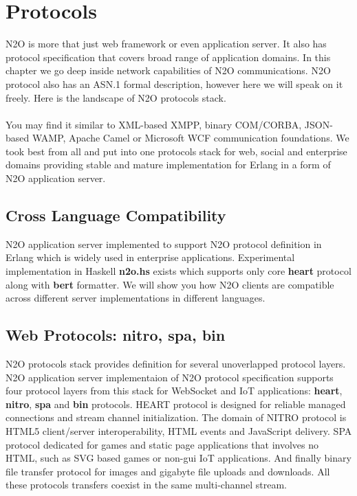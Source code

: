 \section{Protocols}
N2O is more that just web framework or even application server.
It also has protocol specification that covers broad range of application domains.
In this chapter we go deep inside network capabilities of N2O communications.
N2O protocol also has an ASN.1 formal description, however here we will speak on it freely.
Here is the landscape of N2O protocols stack.


\paragraph{}
You may find it similar to XML-based XMPP, binary COM/CORBA,
JSON-based WAMP, Apache Camel or Microsoft WCF communication foundations.
We took best from all and put into one protocols stack for web,
social and enterprise domains providing stable and mature implementation for Erlang
in a form of N2O application server.

\newpage
\subsection*{Cross Language Compatibility}
N2O application server implemented to support N2O protocol definition
in Erlang which is widely used in enterprise applications.
Experimental implementation in Haskell {\bf n2o.hs} exists
which supports only core {\bf heart} protocol along with {\bf bert} formatter.
We will show you how N2O clients are compatible across
different server implementations in different languages.

\subsection*{Web Protocols: {\bf nitro}, {\bf spa}, {\bf bin}}
N2O protocols stack provides definition for several unoverlapped protocol layers.
N2O application server implementaion of N2O protocol specification supports
four protocol layers from this stack for WebSocket and IoT applications:
{\bf heart}, {\bf nitro}, {\bf spa} and {\bf bin} protocols.
HEART protocol is designed for reliable managed connections and stream channel initialization.
The domain of NITRO protocol is HTML5 client/server interoperability, HTML events and JavaScript delivery.
SPA protocol dedicated for games and static page applications that involves no HTML,
such as SVG based games or non-gui IoT applications.
And finally binary file transfer protocol for images and gigabyte file uploads and downloads.
All these protocols transfers coexist in the same multi-channel stream.

